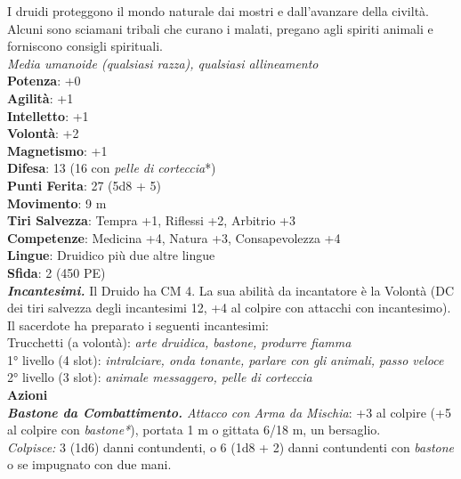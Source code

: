 \begin{multicols}{2}
I druidi proteggono il mondo naturale dai mostri e dall'avanzare della civiltà. Alcuni sono sciamani tribali che curano i malati, pregano agli spiriti animali e forniscono consigli spirituali.\\
\emph{Media umanoide (qualsiasi razza), qualsiasi allineamento}\\
\textbf{Potenza}: +0\\
\textbf{Agilità}: +1\\
\textbf{Intelletto}: +1\\
\textbf{Volontà}: +2\\
\textbf{Magnetismo}: +1\\
\textbf{Difesa}: 13 (16 con \emph{pelle di corteccia}*)\\
\textbf{Punti Ferita}: 27 (5d8 + 5)\\
\textbf{Movimento}: 9 m\\
\textbf{Tiri Salvezza}: Tempra +1, Riflessi +2, Arbitrio +3 \\
\textbf{Competenze}: Medicina +4, Natura +3, Consapevolezza +4\\
\textbf{Lingue}: Druidico più due altre lingue\\
\textbf{Sfida}: 2 (450 PE)\smallskip\\
\emph{\textbf{Incantesimi.}} Il Druido ha CM 4. La sua abilità da incantatore è la Volontà (DC dei tiri salvezza degli incantesimi 12, +4 al colpire con attacchi con incantesimo). Il sacerdote ha preparato i seguenti incantesimi:\\
Trucchetti (a volontà): \emph{arte druidica, bastone, produrre fiamma}\\
1° livello (4 slot): \emph{intralciare, onda tonante, parlare con gli} \emph{animali, passo veloce}\\
2° livello (3 slot): \emph{animale messaggero, pelle di corteccia}\\
\smallskip\textbf{Azioni}\\
\emph{\textbf{Bastone da Combattimento.} Attacco con Arma da Mischia}: +3 al colpire (+5 al colpire con \emph{bastone*}), portata 1 m o gittata 6/18 m, un bersaglio. \\
\emph{Colpisce:} 3 (1d6) danni contundenti, o 6 (1d8 + 2) danni contundenti con \emph{bastone} o se impugnato con due mani.\\


\end{multicols}
